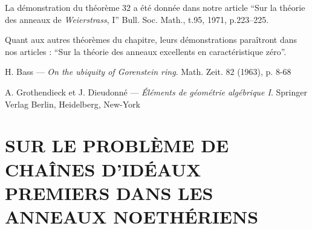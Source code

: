 {La démonstration du théorème 32 a été donnée dans notre article ``Sur la théorie des anneaux de \emph{Weierstrass}, I'' Bull. Soc. Math., t.95, 1971, p.223--225.

Quant aux autres théorèmes du chapitre, leurs démonstrations paraîtront dans nos articles : ``Sur la théorie des anneaux excellents en caractéristique zéro''.

\renewcommand{\bibname}{BIBLIOGRAPHIE}
\def\refname{B\MakeLowercase{IBLIOGRAPHIE}}
\begin{thebibliography}{99}\thispagestyle{empty}

  {\sc H. Bass} ---
  {\it On the ubiquity of Gorenstein ring}. Math. Zeit. 82 (1963), p. 8-68

  {\sc A. Grothendieck et J. Dieudonné} ---
  {\it Éléments de géométrie algébrique I}. Springer Verlag Berlin, Heidelberg, New-York

\end{thebibliography}

\chapter*{SUR LE PROBLÈME DE CHAÎNES D’IDÉAUX PREMIERS DANS LES ANNEAUX NOETHÉRIENS}\thispagestyle{empty}
\label{sec:b}
\section*{}

}
